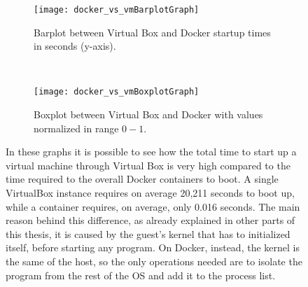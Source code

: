 \begin{figure}[H]
    \centering
    \begin{subfigure}[b]{0.4\textwidth}
        \texttt{[image: docker\_vs\_vmBarplotGraph]}
        \caption{Barplot between Virtual Box and Docker startup times in seconds
          (y-axis).}
        \label{chap:tests:sec:dockervsvb:img:barplot}
    \end{subfigure}
    ~
    \begin{subfigure}[b]{0.4\textwidth}
        \texttt{[image: docker\_vs\_vmBoxplotGraph]}
        \caption{Boxplot between Virtual Box and Docker with values normalized 
in range $0-1$.}
        \label{chap:tests:sec:dockervsvb:img:boxplot}
    \end{subfigure}
    \caption[Virtual Box vs Docker start up comparison]{In these graphs it is
      possible to see how the total time to start up a virtual machine through
      Virtual Box is very high compared to the time required to the overall
      Docker containers to boot. A single VirtualBox instance requires on
      average 20,211 seconds to boot up, while a container requires, on average,
      only 0.016 seconds. The main reason behind this difference, as already
      explained in other parts of this thesis, it is caused by the guest's
      kernel that has to initialized itself, before starting any program. On
      Docker, instead, the kernel is the same of the host, so the only
      operations needed are to isolate the program from the rest of the OS and
      add it to the process list.}
    \label{chap:tests:sec:dockervsvb:subimg:plots}
\end{figure}


\begin{table}[t]
\centering
{}
\caption[Docker vs Virtual Box start up times comparison]{Docker vs Virtual Box
  start up times comparison. Is possible to se how the overall time required to
  start $100$ containers is less than the time to start one traditional virtual
  machine. The overall time required by the traitional virtualization system is
  approximately of 33 minutes, witch gives a significant insight of how much
  time is required to create and boot a virtualized enviroment.}
\label{my-label}
\end{table}


